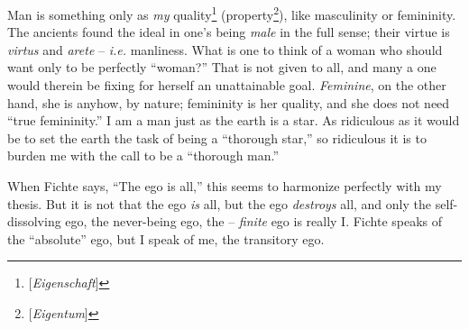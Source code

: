 \documentclass[12pt,a4paper]{book}
\begin{document}
Man is something only as \textit{my} quality\footnote{[\textit{Eigenschaft}]} 
(property\footnote{[\textit{Eigentum}]}), like masculinity or femininity. The 
ancients found the ideal in one's being \textit{male} in the full sense; their 
virtue is \textit{virtus} and \textit{arete} -- \textit{i.e.} manliness. What 
is one to think of a woman who should want only to be perfectly ``woman?'' 
That is not given to all, and many a one would therein be fixing for herself 
an unattainable goal. \textit{Feminine}, on the other hand, she is anyhow, by 
nature; femininity is her quality, and she does not need ``true 
femininity.'' I am a man just as the earth is a star. As ridiculous as it 
would be to set the earth the task of being a ``thorough star,'' so 
ridiculous it is to burden me with the call to be a ``thorough man.''

When Fichte says, ``The ego is all,'' this seems to harmonize perfectly with 
my thesis. But it is not that the ego \textit{is} all, but the ego 
\textit{destroys} all, and only the self-dissolving ego, the never-being ego, 
the -- \textit{finite} ego is really I. Fichte speaks of the ``absolute'' 
ego, but I speak of me, the transitory ego.
\end{document}
